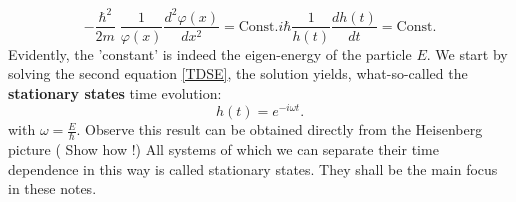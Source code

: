   \begin{subequations}
  	\begin{equation}
  	- \frac{\hbar ^2}{2 m }\; \frac{1}{\varphi(x)} \dfrac{d^2 \varphi{(x)}}{dx^2} = \text{Const.} 
  	\end{equation}
  	\begin{equation}
  	i \hbar \frac{1}{h(t)} \frac{d h(t)}{dt}= \text{Const.}
  	\label{TDSE}
  	\end{equation}
  \end{subequations}
  Evidently, the 'constant' is indeed the eigen-energy of the particle $ E$. We start by solving the second equation \eqref{TDSE}, the solution yields, what-so-called the \textbf{stationary states} time evolution:
  \begin{equation}
  h(t) = e^{- i \omega t}. 
  \end{equation}
  with $ \omega = \frac{E}{\hbar}$. Observe this result can be obtained directly from the Heisenberg picture ( Show how !) All systems of which we can separate their time dependence in this way is called stationary states. They shall be the main focus in these notes. 
